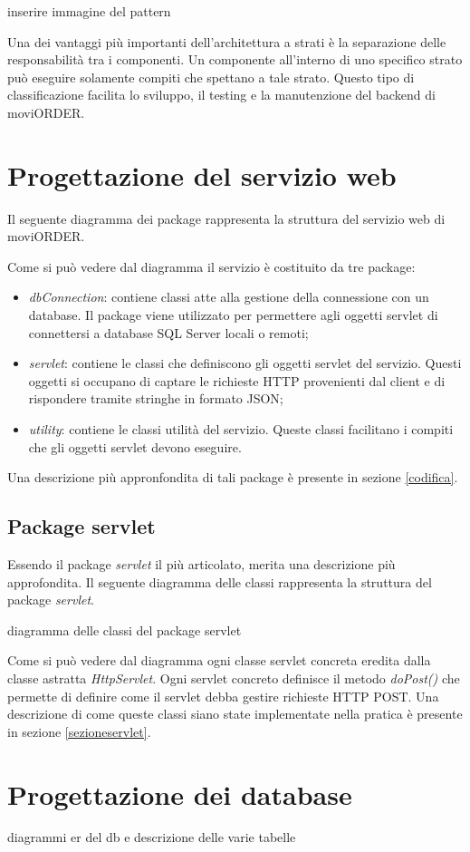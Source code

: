 inserire immagine del pattern

Una dei vantaggi più importanti dell'architettura a strati è la separazione delle responsabilità tra i componenti. Un componente all'interno di uno specifico strato può eseguire solamente compiti che spettano a tale strato. Questo tipo di classificazione facilita lo sviluppo, il testing e la manutenzione del backend di moviORDER.

\section{Progettazione del servizio web}

Il seguente diagramma dei package rappresenta la struttura del servizio web di moviORDER.

Come si può vedere dal diagramma il servizio è costituito da tre package:
\begin{itemize}
	\item \textit{dbConnection}: contiene classi atte alla gestione della connessione con un database. Il package viene utilizzato per permettere agli oggetti servlet di connettersi a database SQL Server locali o remoti;
	\item \textit{servlet}: contiene le classi che definiscono gli oggetti servlet del servizio. Questi oggetti si occupano di captare le richieste HTTP provenienti dal client e di rispondere tramite stringhe in formato JSON;
	\item \textit{utility}: contiene le classi utilità del servizio. Queste classi facilitano i compiti che gli oggetti servlet devono eseguire.
\end{itemize}
Una descrizione più appronfondita di tali package è presente in sezione \ref{codifica}.

\subsection{Package servlet}

Essendo il package \textit{servlet} il più articolato, merita una descrizione più approfondita. Il seguente diagramma delle classi rappresenta la struttura del package \textit{servlet}.

diagramma delle classi del package servlet

Come si può vedere dal diagramma ogni classe servlet concreta eredita dalla classe astratta \textit{HttpServlet}. Ogni servlet concreto definisce il metodo \textit{doPost()} che permette di definire come il servlet debba gestire richieste HTTP POST. Una descrizione di come queste classi siano state implementate nella pratica è presente in sezione \ref{sezioneservlet}.

\section{Progettazione dei database}

diagrammi er del db e descrizione delle varie tabelle

